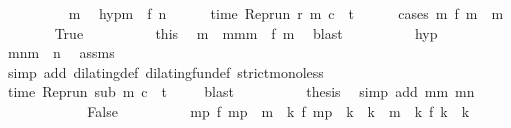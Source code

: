 \begin{isabellebody}
\ \ \isamarkupfalse%
\ {\isacharminus}\isanewline
\ \ \isacommand{{\isacharbraceleft}}\isamarkupfalse%
\ \isamarkupfalse%
\ m\ \isamarkupfalse%
\ hyp{\isacharcolon}{\isacartoucheopen}m\ {\isacharless}\ f\ n{\isacartoucheclose}\isanewline
\ \ \ \ \isamarkupfalse%
\ {\isacartoucheopen}time\ {\isacharparenleft}{\isacharparenleft}Rep{\isacharunderscore}run\ r{\isacharparenright}\ m\ c{\isacharparenright}\ {\isacharless}\ t{\isacartoucheclose}\isanewline
\ \ \ \ \isamarkupfalse%
\ {\isacharparenleft}cases\ {\isacartoucheopen}{\isasymexists}m\ f\ m\ {\isacharequal}\ m{\isacartoucheclose}{\isacharparenright}\isanewline
\ \ \ \ \ \ \isamarkupfalse%
\ True\isanewline
\ \ \ \ \ \ \ \ \isamarkupfalse%
\ this\ \isamarkupfalse%
\ m\ \ mm{}{\isacharcolon}{\isacartoucheopen}m\ {\isacharequal}\ f\ m\ \isamarkupfalse%
\ blast\isanewline
\ \ \ \ \ \ \ \ \isamarkupfalse%
\ hyp\ \isamarkupfalse%
\ m{}n{\isacharcolon}{\isacartoucheopen}m\ {\isacharless}\ n{\isacartoucheclose}\ \isamarkupfalse%
\ assms{\isacharparenleft}{}{\isacharparenright}\isanewline
\ \ \ \ \ \ \ \ \ \ \isamarkupfalse%
\ {\isacharparenleft}simp\ add{\isacharcolon}\ dilating{\isacharunderscore}def\ dilating{\isacharunderscore}fun{\isacharunderscore}def\ strict{\isacharunderscore}mono{\isacharunderscore}less{\isacharparenright}\isanewline
\ \ \ \ \ \ \ \ \isamarkupfalse%
\ {\isacartoucheopen}time\ {\isacharparenleft}{\isacharparenleft}Rep{\isacharunderscore}run\ sub{\isacharparenright}\ m\ c{\isacharparenright}\ {\isacharless}\ t{\isacartoucheclose}\ \isamarkupfalse%
\ {\isacharasterisk}\ \isamarkupfalse%
\ blast\isanewline
\ \ \ \ \ \ \ \ \isamarkupfalse%
\ {\isacharquery}thesis\ \isamarkupfalse%
\ {\isacharparenleft}simp\ add{\isacharcolon}\ mm{}\ m{}n\ {\isacharasterisk}{\isacharasterisk}{\isacharparenright}\isanewline
\ \ \ \ \isamarkupfalse%
\isanewline
\ \ \ \ \ \ \isamarkupfalse%
\ False\isanewline
\ \ \ \ \ \ \ \ \isamarkupfalse%
\ {\isacartoucheopen}{\isasymexists}m\isactrlsub p{\isachardot}\ f\ m\isactrlsub p\ {\isacharless}\ m\ {\isasymand}\ {\isacharparenleft}{\isasymforall}k{\isachardot}\ f\ m\isactrlsub p\ {\isacharless}\ k\ {\isasymand}\ k\ {\isasymle}\ m\ {\isasymlongrightarrow}\ {\isacharparenleft}{\isasymnexists}k\ f\ k\ {\isacharequal}\ k{\isacharparenright}{\isacharparenright}{\isacartoucheclose}\isanewline

\end{isabellebody}
